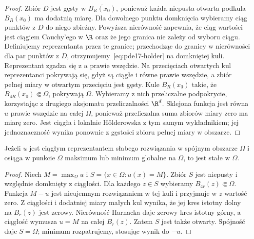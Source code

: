 \begin{proof}
Zbiór $D$ jest gęsty w $\overline{B_R(x_0)}$, ponieważ
każda niepusta otwarta podkula $B_R(x_0)$ ma dodatnią
miarę. Dla dowolnego punktu domknięcia wybieramy ciąg
punktów z $D$ do niego zbieżny. Powyższa nierówność
zapewnia, że ciąg wartości jest ciągiem Cauchy'ego w
$\R$ oraz że jego granica nie zależy od wyboru ciągu.
Definiujemy reprezentanta przez te granice; przechodząc
do granicy w nierówności dla par punktów z $D$,
otrzymujemy~\eqref{eq:pde17-holder} na domkniętej kuli.
Reprezentant zgadza się z $u$ prawie wszędzie.
Na przecięciach otwartych kul reprezentanci pokrywają się,
gdyż są ciągłe i równe prawie wszędzie, a zbiór pełnej
miary w otwartym przecięciu jest gęsty. Kule $B_R(x_0)$ takie, że $B_{4R}(x_0)\Subset\Omega$,
pokrywają $\Omega$. Wybieramy z nich przeliczalne
podpokrycie, korzystając z drugiego aksjomatu przeliczalności
$\R^d$. Sklejona funkcja jest równa $u$ prawie wszędzie
na całej $\Omega$, ponieważ przeliczalna suma zbiorów
miary zero ma miarę zero. Jest ciągła i lokalnie Hölderowska
z tym samym wykładnikiem; jej jednoznaczność wynika ponownie
z gęstości zbioru pełnej miary w obszarze.
\end{proof}

\begin{wniosek}
Jeżeli $u$ jest ciągłym reprezentantem słabego rozwiązania
w spójnym obszarze $\Omega$ i osiąga w punkcie $\Omega$
maksimum lub minimum globalne na $\Omega$, to jest stałe
w $\Omega$.
\end{wniosek}
\begin{proof}
Niech $M=\max_\Omega u$ i $S=\{x\in\Omega:u(x)=M\}$.
Zbiór $S$ jest niepusty i względnie domknięty z ciągłości.
Dla każdego $z\in S$ wybieramy $B_{4r}(z)\Subset\Omega$.
Funkcja $M-u$ jest nieujemnym rozwiązaniem w tej kuli
i przyjmuje w $z$ wartość zero. Z ciągłości i dodatniej
miary małych kul wynika, że jej kres istotny dolny
na $B_r(z)$ jest zerowy. Nierówność Harnacka daje zerowy
kres istotny górny, a ciągłość wymusza $u=M$ na całej
$B_r(z)$. Zatem $S$ jest także otwarty. Spójność daje
$S=\Omega$; minimum rozpatrujemy, stosując wynik do $-u$.
\end{proof}

